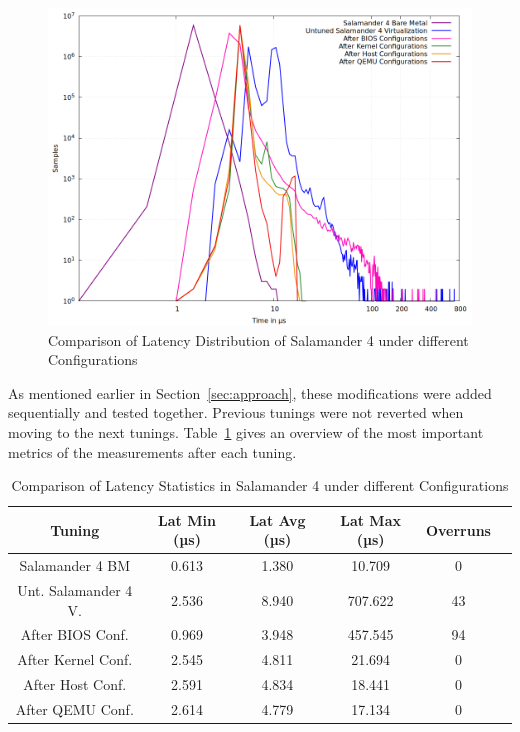 \documentclass[MMR,Master,english]{style/twbook}
\begin{document}
\begin{figure}[H]
	\centering
	\includegraphics[width=0.70\columnwidth]{img/results/gnuplot_combined_max_latency_all.png}
	\caption[Comparison of Latency Distribution of Salamander 4 Configurations]{Comparison of Latency Distribution of Salamander 4 under different Configurations}
	\label{fig:max_latency_combined_results}
\end{figure}

\noindent As mentioned earlier in Section~\ref{sec:approach}, these modifications were added sequentially and tested together. Previous tunings were not reverted when moving to the next tunings. Table~\ref{tab:latency_tables_combined} gives an overview of the most important metrics of the measurements after each tuning.

\begin{table}[H]
	\centering
	\footnotesize
	\caption{Comparison of Latency Statistics in Salamander 4 under different Configurations}
	\label{tab:latency_tables_combined}
	\begin{tabular}{|c|c|c|c|c|c|}
		\hline
		\textbf{Tuning}      & \textbf{Lat Min (µs)} & \textbf{Lat Avg (µs)} & \textbf{Lat Max (µs)} & \textbf{Overruns} \\ \hline
		Salamander 4 BM      & 0.613                 & 1.380                 & 10.709                & 0                 \\ \hline
		Unt. Salamander 4 V. & 2.536                 & 8.940                 & 707.622               & 43                \\ \hline
		After BIOS Conf.     & 0.969                 & 3.948                 & 457.545               & 94                \\ \hline
		After Kernel Conf.   & 2.545                 & 4.811                 & 21.694                & 0                 \\ \hline
		After Host Conf.     & 2.591                 & 4.834                 & 18.441                & 0                 \\ \hline
		After QEMU Conf.     & 2.614                 & 4.779                 & 17.134                & 0                 \\ \hline
	\end{tabular}
\end{table}
\end{document}
